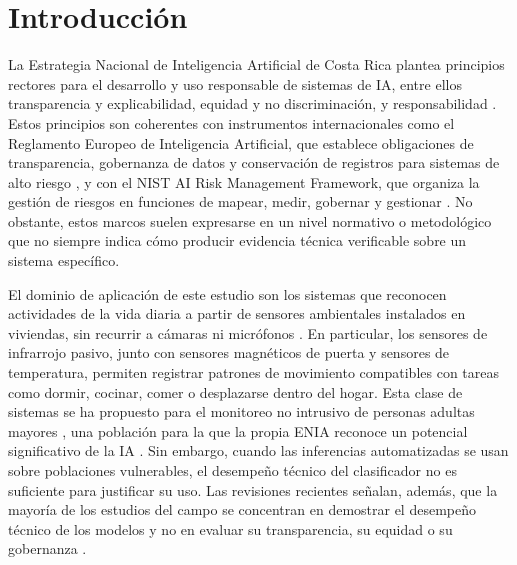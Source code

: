 
\section{Introducción}

La Estrategia Nacional de Inteligencia Artificial de Costa Rica plantea
principios rectores para el desarrollo y uso responsable de sistemas de IA,
entre ellos transparencia y explicabilidad, equidad y no discriminación, y
responsabilidad \cite{micitt2024enia}. Estos principios son coherentes con
instrumentos internacionales como el Reglamento Europeo de Inteligencia
Artificial, que establece obligaciones de transparencia, gobernanza de datos y
conservación de registros para sistemas de alto riesgo \cite{ue2024aiact}, y con
el NIST AI Risk Management Framework, que organiza la gestión de riesgos en
funciones de mapear, medir, gobernar y gestionar \cite{nist2023airmf}. No
obstante, estos marcos suelen expresarse en un nivel normativo o metodológico
que no siempre indica cómo producir evidencia técnica verificable sobre un
sistema específico.

El dominio de aplicación de este estudio son los sistemas que reconocen
actividades de la vida diaria a partir de sensores ambientales instalados en
viviendas, sin recurrir a cámaras ni micrófonos
\cite{kim2022inhome,requena2024independence}. En particular, los sensores de
infrarrojo pasivo, junto con sensores magnéticos de puerta y sensores de
temperatura, permiten registrar patrones de movimiento compatibles con tareas
como dormir, cocinar, comer o desplazarse dentro del hogar. Esta clase de
sistemas se ha propuesto para el monitoreo no intrusivo de personas adultas
mayores \cite{park2025aging}, una población para la que la propia ENIA reconoce
un potencial significativo de la IA \cite[p.~27]{micitt2024enia}. Sin embargo,
cuando las inferencias automatizadas se usan sobre poblaciones vulnerables, el
desempeño técnico del clasificador no es suficiente para justificar su uso.
Las revisiones recientes señalan, además, que la mayoría de los estudios del
campo se concentran en demostrar el desempeño técnico de los modelos y no en
evaluar su transparencia, su equidad o su gobernanza
\cite{park2025aging,habibovic2025aging}.

